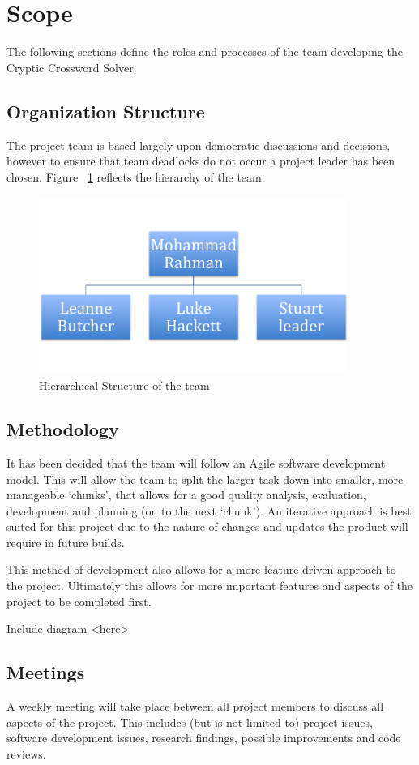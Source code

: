 \newpage
\section{Scope}

The following sections define the roles and processes of the team developing the Cryptic Crossword Solver. 

\subsection{Organization Structure}

The project team is based largely upon democratic discussions and decisions, however to ensure that team deadlocks do not occur a project leader has been chosen. Figure ~\ref{fig:org_hierachy} reflects the hierarchy of the team.


\begin{figure}[here]
\includegraphics[width=0.9\textwidth]{requirements/functional_requirements/org_hierachy.png}
\caption{Hierarchical Structure of the team}
\label{fig:org_hierachy}
\end{figure}


\subsection{Methodology}

It has been decided that the team will follow an Agile software development model. This will allow the team to split the larger task down into smaller, more manageable ‘chunks’, that allows for a good quality analysis, evaluation, development and planning (on to the next ‘chunk’). An iterative approach is best suited for this project due to the nature of changes and updates the product will require in future builds.

This method of development also allows for a more feature-driven approach to the project. Ultimately this allows for more important features and aspects of the project to be completed first. 

Include diagram <here>


\subsection{Meetings}

A weekly meeting will take place between all project members to discuss all aspects of the project. This includes (but is not limited to) project issues, software development issues, research findings, possible improvements and code reviews.

